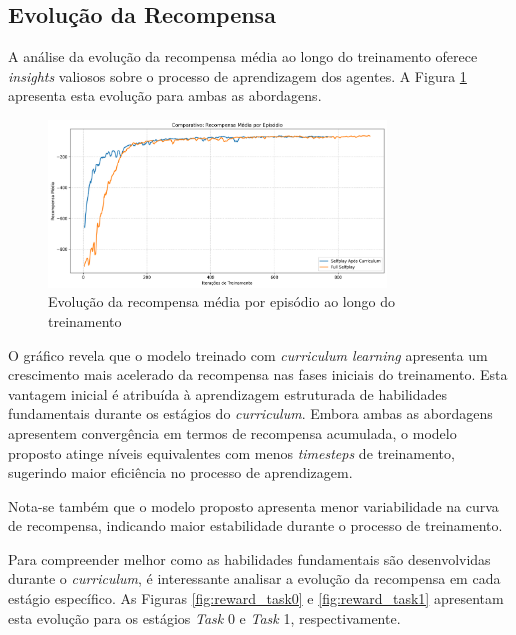 \subsection{Evolução da Recompensa}

A análise da evolução da recompensa média ao longo do treinamento oferece \textit{insights} valiosos sobre o processo de aprendizagem dos agentes. A Figura \ref{fig:episode_reward} apresenta esta evolução para ambas as abordagens.

\begin{figure}[H]
    \centering
    \includegraphics[width=0.8\textwidth]{fig/graficos_trabalho/graficos_experimentos/geral/comparativo_recompensa_media.png}
    \caption{Evolução da recompensa média por episódio ao longo do treinamento}
    \label{fig:episode_reward}
\end{figure}

O gráfico revela que o modelo treinado com \textit{curriculum learning} apresenta um crescimento mais acelerado da recompensa nas fases iniciais do treinamento. Esta vantagem inicial é atribuída à aprendizagem estruturada de habilidades fundamentais durante os estágios do \textit{curriculum}. Embora ambas as abordagens apresentem convergência em termos de recompensa acumulada, o modelo proposto atinge níveis equivalentes com menos \textit{timesteps} de treinamento, sugerindo maior eficiência no processo de aprendizagem.

Nota-se também que o modelo proposto apresenta menor variabilidade na curva de recompensa, indicando maior estabilidade durante o processo de treinamento.

Para compreender melhor como as habilidades fundamentais são desenvolvidas durante o \textit{curriculum}, é interessante analisar a evolução da recompensa em cada estágio específico. As Figuras \ref{fig:reward_task0} e \ref{fig:reward_task1} apresentam esta evolução para os estágios \textit{Task} 0 e \textit{Task} 1, respectivamente.

